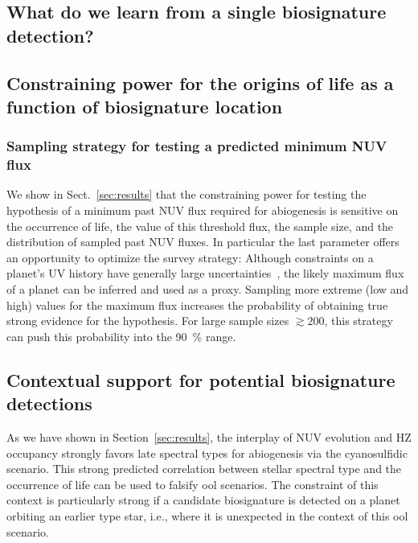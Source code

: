 \documentclass[modern,linenumbers]{aastex631}
\begin{document}
\subsection{What do we learn from a single biosignature detection?}

\subsection{Constraining power for the origins of life as a function of biosignature location}
\subsubsection{Sampling strategy for testing a predicted minimum \gls{NUV} flux}
We show in Sect.~\ref{sec:results} that the constraining power for testing the hypothesis of a minimum past \gls{NUV} flux required for abiogenesis is sensitive on the occurrence of life, the value of this threshold flux, the sample size, and the distribution of sampled past \gls{NUV} fluxes.
In particular the last parameter offers an opportunity to optimize the survey strategy: Although constraints on a planet's UV history have generally large uncertainties~\citep[e.g.,][]{Richey-Yowell2023}, the likely maximum flux of a planet can be inferred and used as a proxy.
Sampling more extreme (low and high) values for the maximum flux increases the probability of obtaining true strong evidence for the hypothesis.
For large sample sizes $\gtrsim 200$, this strategy can push this probability into the \SI{90}{\percent} range.




\subsection{Contextual support for potential biosignature detections}
As we have shown in Section~\ref{sec:results}, the interplay of \gls{NUV} evolution and \gls{HZ} occupancy strongly favors late spectral types for abiogenesis via the cyanosulfidic scenario.
This strong predicted correlation between stellar spectral type and the occurrence of life can be used to falsify \gls{ool} scenarios.
The constraint of this context is particularly strong if a candidate biosignature is detected on a planet orbiting an earlier type star, i.e., where it is unexpected in the context of this \gls{ool} scenario.
\end{document}
